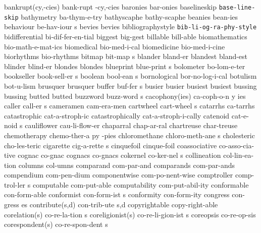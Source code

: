 \2 bankrupt(cy,-cies)	bank-rupt -cy,-cies
\1 baronies		bar-onies
\1 baselineskip 	{\tt\bs base-line-skip}
\1 bathymetry		ba-thym-e-try
\1 bathyscaphe		bathy-scaphe
\1 beanies		bean-ies
\5 behaviour		be-hav-iour s
\1 bevies		bevies
\1 bibliographystyle	{\tt\bs bib-li-og-ra-phy-style}
\1 bidifferential	bi-dif-fer-en-tial
\1 biggest		big-gest
\1 billable		bill-able
\1 biomathematics	bio-math-e-mat-ics
\1 biomedical		bio-med-i-cal		%
\1 biomedicine		bio-med-i-cine
\1 biorhythms		bio-rhythms
\5 bitmap		bit-map s
\1 blander		bland-er
\1 blandest		bland-est
\1 blinder		blind-er
\1 blondes		blondes
\5 blueprint		blue-print s
\1 bolometer		bo-lom-e-ter
\5 bookseller		book-sell-er s		%
\5 boolean		bool-ean s		%
\1 bornological 	bor-no-log-i-cal
\1 botulism		bot-u-lism
\1 brusquer		brusquer
\5 buffer		buf-fer s		%
\1 busier		busier
\1 busiest		busiest
\1 bussing		bussing
\1 butted		butted
\5 buzzword		buzz-word s
\3 cacophony(ies)	ca-coph-o-n y ies
\5 caller		call-er s		%
\1 cameramen		cam-era-men
\5 cartwheel		cart-wheel s
\1 catarrhs		ca-tarrhs
\1 catastrophic		cat-a-stroph-ic
\1 catastrophically	cat-a-stroph-i-cally
\5 catenoid		cat-e-noid s		%
\1 cauliflower		cau-li-flow-er
\1 chaparral		chap-ar-ral
\1 chartreuse		char-treuse
\6 chemotherapy 	chemo-ther-a py -pies   %
\5 chloromethane	chloro-meth-ane s	%
\1 cholesteric		cho-les-teric
\5 cigarette		cig-a-rette s
\1 cinquefoil		cinque-foil
\1 coassociative	co-asso-cia-tive	%
\1 cognac		co-gnac
\1 cognacs		co-gnacs
\5 cokernel		co-ker-nel s		%
\1 collineation 	col-lin-ea-tion		%
\1 columns              col-umns             %
\1 comparand		com-par-and
\1 comparands		com-par-ands
\1 compendium		com-pen-dium         %
\1 componentwise	com-po-nent-wise     %
\5 comptroller		comp-trol-ler s
\NewWordtrue
\1 computable		com-put-able		%
\1 computability	com-put-abil-ity	%
\1 conformable		con-form-able
\5 conformist		con-form-ist s
\1 conformity		con-form-ity
\5 congress		con-gress es
\2 contribute(s,d)	con-trib-ute s,d
\NewWordtrue
\1 copyrightable	copy-right-able		%
\2 corelation(s)	co-re-la-tion s		%
\2 coreligionist(s)	co-re-li-gion-ist s	%
\1 coreopsis		co-re-op-sis		%
\2 corespondent(s)	co-re-spon-dent s	%
